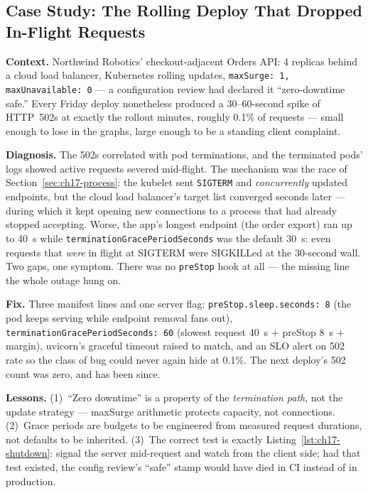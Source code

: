\subsection{Case Study: The Rolling Deploy That Dropped In-Flight Requests}
\label{sec:ch17-case}

\textbf{Context.} Northwind Robotics' checkout-adjacent Orders API: 4
replicas behind a cloud load balancer, Kubernetes rolling updates,
\texttt{maxSurge: 1, maxUnavailable: 0} --- a configuration review had
declared it ``zero-downtime safe.'' Every Friday deploy nonetheless
produced a 30--60-second spike of HTTP~502s at exactly the rollout
minutes, roughly 0.1\% of requests --- small enough to lose in the
graphs, large enough to be a standing client complaint.

\textbf{Diagnosis.} The 502s correlated with pod terminations, and the
terminated pods' logs showed active requests severed mid-flight. The
mechanism was the race of Section~\ref{sec:ch17-process}: the kubelet
sent \texttt{SIGTERM} and \emph{concurrently} updated endpoints, but the
cloud load balancer's target list converged seconds later --- during
which it kept opening new connections to a process that had already
stopped accepting. Worse, the app's longest endpoint (the order export)
ran up to 40~s while \texttt{terminationGracePeriodSeconds} was the
default 30~s: even requests that \emph{were} in flight at SIGTERM were
SIGKILLed at the 30-second wall. Two gaps, one symptom. There was no
\texttt{preStop} hook at all --- the missing line the whole outage hung
on.

\textbf{Fix.} Three manifest lines and one server flag:
\texttt{preStop.sleep.seconds: 8} (the pod keeps serving while endpoint
removal fans out), \texttt{terminationGracePeriodSeconds: 60}
(slowest request 40~s $+$ preStop 8~s $+$ margin), uvicorn's graceful
timeout raised to match, and an SLO alert on 502 rate so the class of
bug could never again hide at 0.1\%. The next deploy's 502 count was
zero, and has been since.

\textbf{Lessons.} (1)~``Zero downtime'' is a property of the
\emph{termination path}, not the update strategy --- maxSurge arithmetic
protects capacity, not connections. (2)~Grace periods are budgets to be
engineered from measured request durations, not defaults to be
inherited. (3)~The correct test is exactly Listing~\ref{lst:ch17-shutdown}:
signal the server mid-request and watch from the client side; had that
test existed, the config review's ``safe'' stamp would have died in CI
instead of in production.

